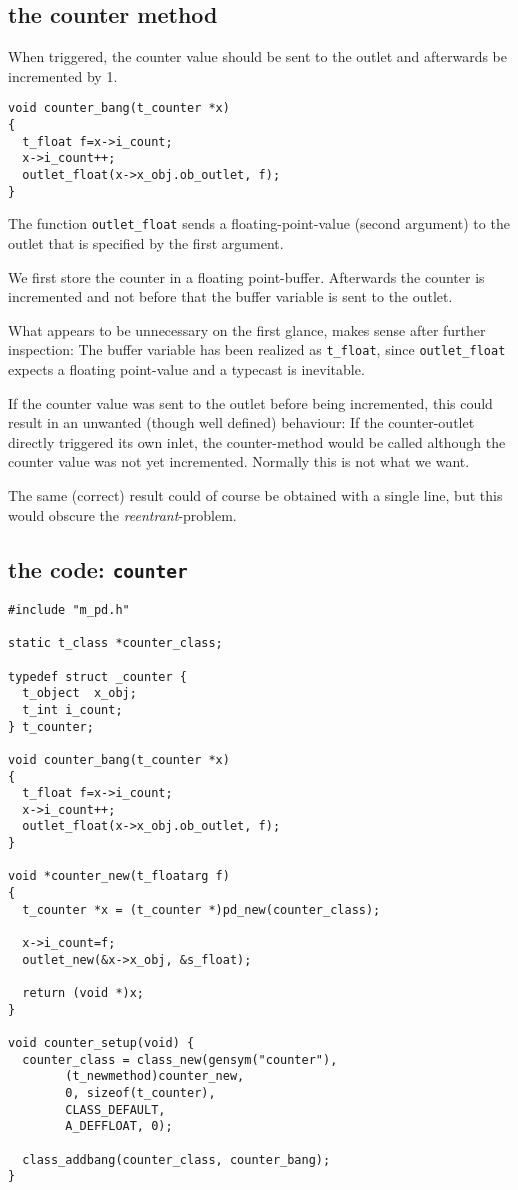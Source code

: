 \documentclass[12pt, a4paper,english,titlepage]{article}
\begin{document}
\subsection{the counter method}
When triggered, the counter value should be sent to the outlet
and afterwards be incremented by 1.

\begin{verbatim}
void counter_bang(t_counter *x)
{
  t_float f=x->i_count;
  x->i_count++;
  outlet_float(x->x_obj.ob_outlet, f);
}
\end{verbatim}

The function \verb+outlet_float+ sends a floating-point-value (second argument) to the outlet
that is specified by the first argument.

We first store the counter in a floating point-buffer.
Afterwards the counter is incremented and not before that the buffer variable is sent 
to the outlet.

What appears to be unnecessary on the first glance, makes sense after further
inspection:
The buffer variable has been realized as \verb+t_float+,
since \verb+outlet_float+ expects a floating point-value and a typecast is
inevitable.

If the counter value was sent to the outlet before being incremented,
this could result in an unwanted (though well defined) behaviour:
If the counter-outlet directly triggered its own inlet,
the counter-method would be called although the counter value was not yet incremented.
Normally this is not what we want.

The same (correct) result could of course be obtained with a single line,
but this  would obscure the {\em reentrant}-problem.

\subsection{the code: \tt counter}

\begin{verbatim}
#include "m_pd.h"

static t_class *counter_class;

typedef struct _counter {
  t_object  x_obj;
  t_int i_count;
} t_counter;

void counter_bang(t_counter *x)
{
  t_float f=x->i_count;
  x->i_count++;
  outlet_float(x->x_obj.ob_outlet, f);
}

void *counter_new(t_floatarg f)
{
  t_counter *x = (t_counter *)pd_new(counter_class);

  x->i_count=f;
  outlet_new(&x->x_obj, &s_float);

  return (void *)x;
}

void counter_setup(void) {
  counter_class = class_new(gensym("counter"),
        (t_newmethod)counter_new,
        0, sizeof(t_counter),
        CLASS_DEFAULT,
        A_DEFFLOAT, 0);

  class_addbang(counter_class, counter_bang);
}
\end{verbatim}
\end{document}

